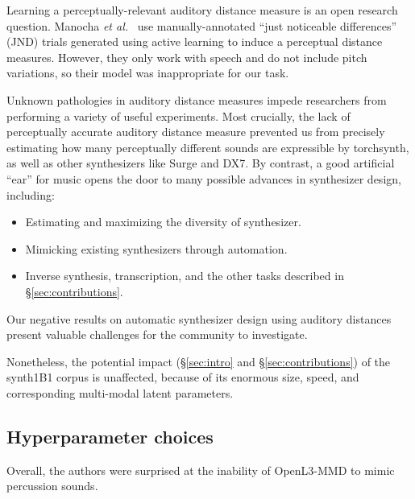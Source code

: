 Learning a perceptually-relevant auditory distance measure is an open research question. Manocha {\em et al.}\ \cite{Manocha:2020:ADP} use manually-annotated ``just noticeable differences'' (JND) trials generated using active learning to induce a perceptual distance measures. However, they only work with speech and do not include pitch variations, so their model was inappropriate for our task.

Unknown pathologies in auditory distance measures impede researchers from performing a variety of useful experiments. Most crucially, the lack of perceptually accurate auditory distance measure prevented us from precisely estimating how many perceptually different sounds are expressible by torchsynth, as well as other synthesizers like Surge and DX7. By contrast, a good artificial ``ear'' for music opens the door to many possible advances in synthesizer design, including:
\begin{itemize}
    \item Estimating and maximizing the diversity of synthesizer.
    \item Mimicking existing synthesizers through automation.
    \item Inverse synthesis, transcription, and the other tasks described in \S\ref{sec:contributions}. 
\end{itemize}
Our negative results on automatic synthesizer design using auditory distances present valuable challenges for the community to investigate.

Nonetheless, the potential impact (\S\ref{sec:intro} and \S\ref{sec:contributions}) of the synth1B1 corpus is unaffected, because of its enormous size, speed, and corresponding multi-modal latent parameters.



\iffalse
\subsection{Hyperparameter choices}

Overall, the authors were surprised at the inability of OpenL3-MMD to mimic percussion sounds.

